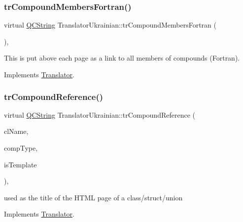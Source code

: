 \subsubsection{\texorpdfstring{trCompoundMembersFortran()}{trCompoundMembersFortran()}}
{\footnotesize\ttfamily virtual \mbox{\hyperlink{class_q_c_string}{Q\+C\+String}} Translator\+Ukrainian\+::tr\+Compound\+Members\+Fortran (\begin{DoxyParamCaption}{ }\end{DoxyParamCaption})\hspace{0.3cm}{\ttfamily [inline]}, {\ttfamily [virtual]}}

This is put above each page as a link to all members of compounds (Fortran). 

Implements \mbox{\hyperlink{class_translator}{Translator}}.

\mbox{\label{class_translator_ukrainian_abab6b77c1d814b3660a47210e32e1d21}} 
\subsubsection{\texorpdfstring{trCompoundReference()}{trCompoundReference()}}
{\footnotesize\ttfamily virtual \mbox{\hyperlink{class_q_c_string}{Q\+C\+String}} Translator\+Ukrainian\+::tr\+Compound\+Reference (\begin{DoxyParamCaption}\item[{const char $\ast$}]{cl\+Name,  }\item[{\mbox{\hyperlink{class_class_def_ae70cf86d35fe954a94c566fbcfc87939}{Class\+Def\+::\+Compound\+Type}}}]{comp\+Type,  }\item[{bool}]{is\+Template }\end{DoxyParamCaption})\hspace{0.3cm}{\ttfamily [inline]}, {\ttfamily [virtual]}}

used as the title of the H\+T\+ML page of a class/struct/union 

Implements \mbox{\hyperlink{class_translator}{Translator}}.

\mbox{\label{class_translator_ukrainian_a59295baa1ec01087d206adedb014691e}} 
